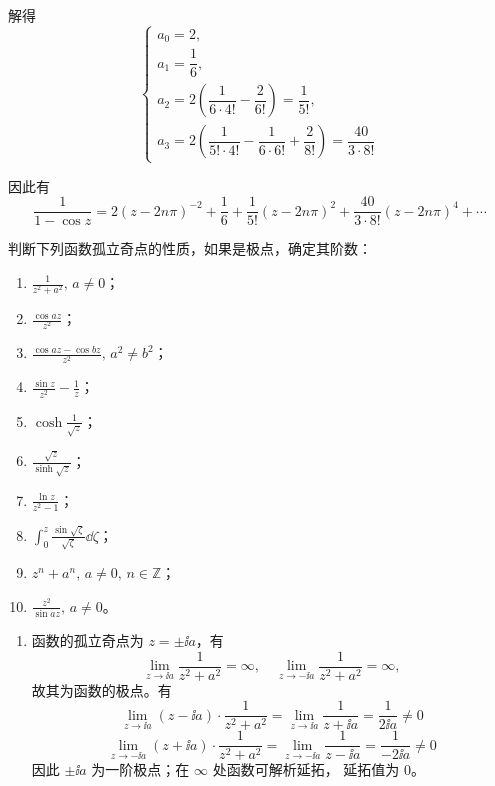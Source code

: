 \begin{question}
\begin{solution}
\begin{enumerate}
解得
\[
\begin{cases}
a_0 = 2,\\
a_1 = \dfrac{1}{6},\\
a_2 = 2\left(\dfrac{1}{6\cdot 4!} - \dfrac{2}{6!}\right) = \dfrac{1}{5!},\\
a_3 = 2\left(\dfrac{1}{5!\cdot 4!} - \dfrac{1}{6\cdot 6!} + \dfrac{2}{8!}\right) = \dfrac{40}{3\cdot 8!}
\end{cases}
\]

因此有
\[
\frac{1}{1-\cos z}
= 2(z-2n\pi)^{-2} + \frac{1}{6} + \frac{1}{5!}(z-2n\pi)^2 + \frac{40}{3\cdot 8!}(z-2n\pi)^4 + \cdots
\]
\end{enumerate}
\end{solution}
\end{question}

\begin{question}
判断下列函数孤立奇点的性质，如果是极点，确定其阶数：

\begin{enumerate}
  \item \(\displaystyle\frac{1}{z^2+a^2},\,a\neq 0\)；

  \item \(\displaystyle\frac{\cos a z}{z^2}\)；

  \item \(\displaystyle\frac{\cos a z - \cos b z}{z^2},\,a^2\neq b^2\)；

  \item \(\displaystyle\frac{\sin z}{z^2} - \frac{1}{z}\)；

  \item \(\displaystyle\cosh\frac{1}{\sqrt{z}}\)；

  \item \(\displaystyle\frac{\sqrt{z}}{\sinh\sqrt{z}}\)；

  \item \(\displaystyle\frac{\ln z}{z^2-1}\)；

  \item \(\displaystyle\int_0^z \frac{\sin\sqrt{\zeta}}{\sqrt{\zeta}}\dd{\zeta}\)；

  \item \(\displaystyle z^n + a^n,\,a\neq 0,\,n\in\mathbb{Z}\)；

  \item \(\displaystyle\frac{z^2}{\sin a z},\,a\neq 0\)。

\end{enumerate}
\begin{solution}
\begin{enumerate}
  \item 函数的孤立奇点为 \(z=\pm \ii a\)，有
\[
\lim_{z\to\ii a} \frac{1}{z^2+a^2} = \infty,\quad
\lim_{z\to-\ii a} \frac{1}{z^2+a^2} = \infty,
\]
故其为函数的极点。有
\[
\lim_{z\to\ii a} (z-\ii a) \cdot \frac{1}{z^2+a^2}
= \lim_{z\to\ii a} \frac{1}{z+\ii a} = \frac{1}{2\ii a} \neq 0
\]
\[
\lim_{z\to-\ii a} (z+\ii a) \cdot \frac{1}{z^2+a^2}
= \lim_{z\to-\ii a} \frac{1}{z-\ii a} = \frac{1}{-2\ii a} \neq 0
\]
因此 \(\pm \ii a\) 为一阶极点；在 \(\infty\) 处函数可解析延拓，
延拓值为 \(0\)。


\end{enumerate}
\end{solution}
\end{question}
